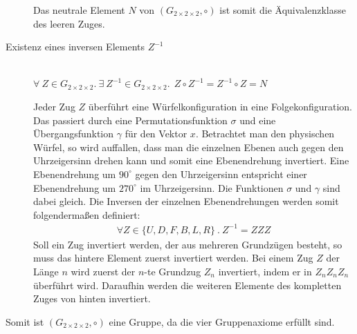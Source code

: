 \documentclass[12pt,a4paper, usenames, dvipsnames]{article}
\theoremstyle{mystyle}
\theoremstyle{definition}
\newcommand{\Gtwo}{\ensuremath{G_{2\times 2\times 2}}}
\begin{document}
\begin{description}
Das neutrale Element $N$ von $(\Gtwo, \circ)$ ist somit die Äquivalenzklasse des leeren Zuges.


\item [Existenz eines inversen Elements $Z^{-1}$] \ \\
$\forall \  Z \in \Gtwo.\ \exists \  Z^{-1} \in \Gtwo.  \ \ Z \circ Z^{-1} = Z^{-1} \circ Z = N$  


Jeder Zug $Z$ überführt eine Würfelkonfiguration in eine Folgekonfiguration. 
Das passiert durch eine Permutationsfunktion $\sigma$ und eine Übergangsfunktion $\gamma$ für den Vektor $x$. 
Betrachtet man den physischen Würfel, so wird auffallen, dass man die einzelnen Ebenen auch gegen den Uhrzeigersinn drehen kann und somit eine Ebenendrehung invertiert. Eine Ebenendrehung um $90^\circ$ gegen den Uhrzeigersinn entspricht einer Ebenendrehung um $270^\circ$ im Uhrzeigersinn. Die Funktionen $\sigma$ und $\gamma$ sind dabei gleich.
Die Inversen der einzelnen Ebenendrehungen werden somit folgendermaßen definiert:
\begin{align*}
\forall Z \in \{U, D, F, B, L, R\} \ . \ Z^{-1} = ZZZ
\end{align*}
Soll ein Zug invertiert werden, der aus mehreren Grundzügen besteht, so muss das hintere Element zuerst invertiert werden. Bei einem Zug $Z$ der Länge $n$ wird zuerst der $n$-te Grundzug $Z_n$ invertiert, indem er in $Z_nZ_nZ_n$ überführt wird. Daraufhin werden die weiteren Elemente des kompletten Zuges von hinten invertiert.

\end{description}
Somit ist $(\Gtwo, \circ)$ eine Gruppe, da die vier Gruppenaxiome erfüllt sind. 
\end{document}
